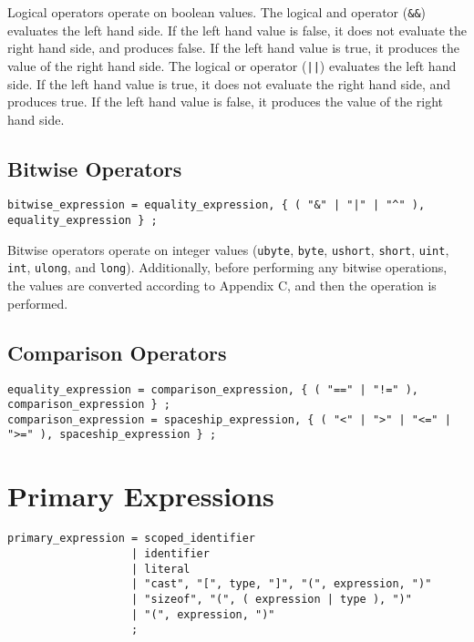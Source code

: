 \documentclass[letterpaper,12pt]{book}
\begin{document}
Logical operators operate on boolean values. The logical and operator (\texttt{\&\&}) evaluates the left hand side. If the left hand value is false, it does not evaluate the right hand side, and produces false. If the left hand value is true, it produces the value of the right hand side. The logical or operator (\texttt{||}) evaluates the left hand side. If the left hand value is true, it does not evaluate the right hand side, and produces true. If the left hand value is false, it produces the value of the right hand side.

\subsection{Bitwise Operators}

\begin{lstlisting}[breaklines=true]
bitwise_expression = equality_expression, { ( "&" | "|" | "^" ), equality_expression } ;
\end{lstlisting}

Bitwise operators operate on integer values (\texttt{ubyte}, \texttt{byte}, \texttt{ushort}, \texttt{short}, \texttt{uint}, \texttt{int}, \texttt{ulong}, and \texttt{long}). Additionally, before performing any bitwise operations, the values are converted according to Appendix C, and then the operation is performed.

\subsection{Comparison Operators}

\begin{lstlisting}[breaklines=true]
equality_expression = comparison_expression, { ( "==" | "!=" ), comparison_expression } ;
comparison_expression = spaceship_expression, { ( "<" | ">" | "<=" | ">=" ), spaceship_expression } ;
\end{lstlisting}

\section{Primary Expressions}

\begin{lstlisting}[breaklines=true]
primary_expression = scoped_identifier
                   | identifier
                   | literal
                   | "cast", "[", type, "]", "(", expression, ")"
                   | "sizeof", "(", ( expression | type ), ")"
                   | "(", expression, ")"
                   ;
\end{lstlisting}
\end{document}
